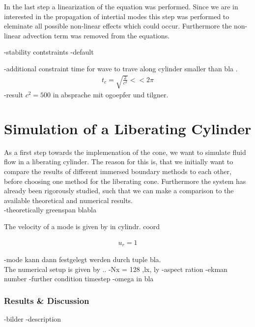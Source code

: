 In the last step a linearization of the equation was performed.
Since we are in interested in the propagation of intertial modes this
step was performed to eleminate all possible non-linear effects which could occur.
Furthermore the non-linear advection term was removed from the equations.

-stability contstraints
-default

-additional constraint time for wave to trave along cylinder smaller than bla \citep{TILGNER, OGOEPFERT}.
\begin{align}
    t_{c} = \sqrt{\frac{2}{c^2}} << 2\pi
\end{align}
-result $c^2 = 500$ in absprache mit ogoepfer und tilgner.



\newpage

\section{Simulation of a Liberating Cylinder}

As a first step towards the implemenation of the cone,
we want to simulate fluid flow in a liberating cylinder.
The reason for this is, that we initially want to
compare the results of different immersed boundary methods to each other,
before choosing one method for the liberating cone.
Furthermore the system has already been rigorously studied, such that
we can make a comparison to the available theoretical and numerical results.\\

-theoretically greenspan  blabla

The velocity of a mode is given by in cylindr. coord

\begin{align}
    u_r =  1
\end{align}

-mode kann dann festgelegt werden durch tuple bla.\\
The numerical setup is  given by ..
-Nx  = 128 ,lx, ly
-aspect ration
-ekman number
-further condition timestep
-omega in bla
\newpage

\subsubsection{Results \& Discussion}

-bilder
-description


